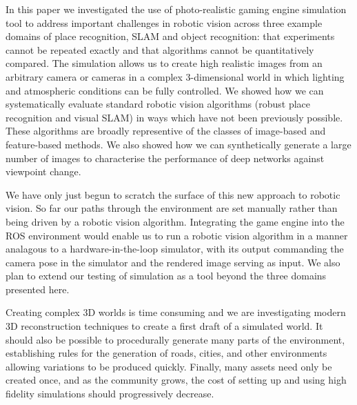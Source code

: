 \documentclass[letterpaper, 10 pt, conference]{ieeeconf}  %
\begin{document}
In this paper we investigated the use of photo-realistic gaming engine simulation tool to address important challenges in robotic vision across three example domains of place recognition, SLAM and object recognition: that
experiments cannot  be repeated exactly and that algorithms cannot be quantitatively compared.
The simulation allows us to create high realistic images from an arbitrary camera or cameras in a complex 3-dimensional world in which lighting and atmospheric
conditions can be fully controlled.
We  showed how we can systematically evaluate standard robotic vision algorithms (robust place recognition and visual SLAM) in ways which have not
been previously possible.  These algorithms are broadly representive of the classes of image-based and feature-based methods.
We also showed how we can synthetically generate a large number of images to characterise the performance of deep networks against viewpoint change. 

We have only just begun to scratch the surface of this new approach to robotic vision.
So far our paths through the environment are set manually rather than being driven by a robotic vision algorithm.
Integrating the game engine into the ROS environment would enable us to run a robotic vision algorithm in a manner analagous to a 
hardware-in-the-loop simulator, with its output commanding the camera pose in the simulator and the rendered image serving as input.
We also plan to extend our testing of simulation as a tool beyond the three domains presented here. 

Creating complex 3D worlds is time consuming and we are investigating modern 3D reconstruction techniques to create a first draft of a simulated world. It should also be possible to procedurally generate many parts of the environment, establishing rules for the generation of roads, cities, and other environments allowing variations to be produced quickly. Finally, many assets need only be created once, and as the community grows, the cost of setting up and using high fidelity simulations should progressively decrease. 
\end{document}

